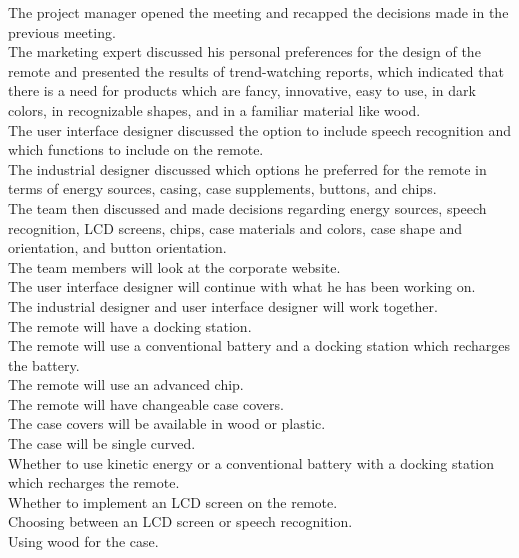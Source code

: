 \documentclass[11pt,a4paper]{article}
\begin{document}
\fontsize{11pt}{11pt}\selectfont
\begin{mdframed}[style=theoremstyle, frametitle={Reference Summary (254 words)}]
The project manager opened the meeting and recapped the decisions made in the previous meeting.
\\ The marketing expert discussed his personal preferences for the design of the remote and presented the results of trend-watching reports, which indicated that there is a need for products which are fancy, innovative, easy to use, in dark colors, in recognizable shapes, and in a familiar material like wood.
\\ The user interface designer discussed the option to include speech recognition and which functions to include on the remote.
\\ The industrial designer discussed which options he preferred for the remote in terms of energy sources, casing, case supplements, buttons, and chips.
\\ The team then discussed and made decisions regarding energy sources, speech recognition, LCD screens, chips, case materials and colors, case shape and orientation, and button orientation.
\\ The team members will look at the corporate website.
\\ The user interface designer will continue with what he has been working on.
\\ The industrial designer and user interface designer will work together.
\\ The remote will have a docking station.
\\ The remote will use a conventional battery and a docking station which recharges the battery.
\\ The remote will use an advanced chip.
\\ The remote will have changeable case covers.
\\ The case covers will be available in wood or plastic.
\\ The case will be single curved.
\\ Whether to use kinetic energy or a conventional battery with a docking station which recharges the remote.
\\ Whether to implement an LCD screen on the remote.
\\ Choosing between an LCD screen or speech recognition.
\\ Using wood for the case.
\end{mdframed}
\end{document}
